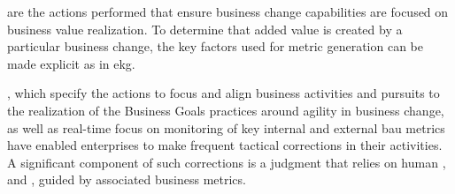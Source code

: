 %
%
 are the actions performed that ensure business change capabilities are
focused on business value realization.
To determine that added value is created by a particular business change, the key factors used for metric generation
can be made explicit as in \gls{ekg}.

, which specify the actions to focus and align
business activities and pursuits to the realization of the Business Goals practices around agility in
business change, as well as real-time focus on monitoring of key internal and external \gls{bau} metrics have enabled
enterprises to make frequent tactical corrections in their activities.
A significant component of such corrections is a judgment that relies on human , 
and , guided by associated business metrics.
